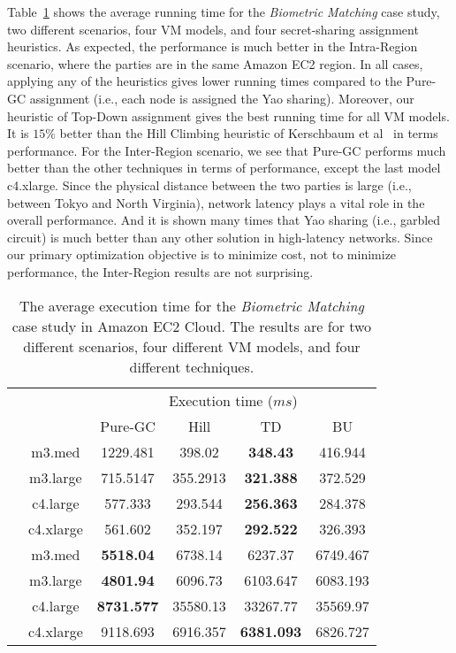\documentclass{llncs}
\begin{document}
Table~\ref{table:case:bio:run} shows the average running time for the \emph{Biometric Matching} case study, two different scenarios, four VM models, and four secret-sharing assignment heuristics. As expected, the performance is much better in the Intra-Region scenario, where the parties are in the same Amazon EC2 region. In all cases, applying any of the heuristics gives lower running times compared to the Pure-GC assignment (i.e., each node is assigned the Yao sharing). Moreover, our heuristic of Top-Down assignment gives the best running time for all VM models. It is $15\%$ better than the Hill Climbing heuristic of Kerschbaum et al~\cite{cite:kerschbaum2014automatic} in terms performance. For the Inter-Region scenario, we see that Pure-GC performs much better than the other techniques in terms of performance, except the last model c4.xlarge. Since the physical distance between the two parties is large (i.e., between Tokyo and North Virginia), network latency plays a vital role in the overall performance. And it is shown many times that Yao sharing (i.e., garbled circuit) is much better than any other solution in high-latency networks. Since our primary optimization objective is to minimize cost, not to minimize performance, the Inter-Region results are not surprising. 

\begin{table}[hbt]
	\scriptsize
	\centering
	\begin{tabular}{|c|c|c|c|c|c|}
	
	\cline{3-6}
	\multicolumn{2}{c|}{} & \multicolumn{4}{|c|}{Execution time ($ms$)} \\
	\cline{3-6}
	\multicolumn{2}{c|}{} & Pure-GC & Hill & TD & BU \\
	\hline
	
	\parbox[t]{2mm}{} 
 & m3.med & 1229.481 & 398.02 & \textbf{348.43} & 416.944 \\
 & m3.large & 715.5147 & 355.2913 & \textbf{321.388} & 372.529 \\
 & c4.large & 577.333 & 293.544 & \textbf{256.363} & 284.378 \\
 & c4.xlarge & 561.602 & 352.197 & \textbf{292.522} & 326.393 \\		
	\hline		
	\parbox[t]{2mm}{} 
 & m3.med & \textbf{5518.04} & 6738.14 & 6237.37 & 6749.467 \\
 & m3.large & \textbf{4801.94} & 6096.73 & 6103.647 & 6083.193 \\
 & c4.large & \textbf{8731.577} & 35580.13 & 33267.77 & 35569.97 \\
 & c4.xlarge & 9118.693 & 6916.357 & \textbf{6381.093} & 6826.727 \\
	\hline
	\end{tabular}

	\caption{The average execution time for the \emph{Biometric Matching} case study in Amazon EC2 Cloud. The results are for two different scenarios, four different VM models, and four different techniques.}
	\label{table:case:bio:run}
\end{table}
\end{document}
